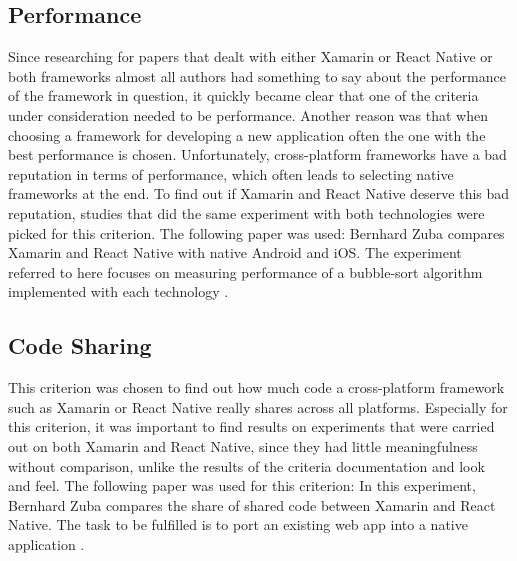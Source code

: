 \documentclass[Bachelor,BIF,english]{twbook}
\begin{document}
\subsection{Performance}
Since researching for papers that dealt with either Xamarin or React Native or both frameworks almost all authors had something to say about the performance of the framework in question, it quickly became clear that one of the criteria under consideration needed to be performance. Another reason was that when choosing a framework for developing a new application often the one with the best performance is chosen. Unfortunately, cross-platform frameworks have a bad reputation in terms of performance, which often leads to selecting native frameworks at the end. To find out if Xamarin and React Native deserve this bad reputation, studies that did the same experiment with both technologies were picked for this criterion. The following paper was used: Bernhard Zuba compares Xamarin and React Native with native Android and iOS. The experiment referred to here focuses on measuring performance of a bubble-sort algorithm implemented with each technology \cite[p.~30-32]{ZubaBernhard2017EdPb}.

\subsection{Code Sharing}
This criterion was chosen to find out how much code a cross-platform framework such as Xamarin or React Native really shares across all platforms. Especially for this criterion, it was important to find results on experiments that were carried out on both Xamarin and React Native, since they had little meaningfulness without comparison, unlike the results of the criteria documentation and look and feel. The following paper was used for this criterion: In this experiment, Bernhard Zuba compares the share of shared code between Xamarin and React Native. The task to be fulfilled is to port an existing web app into a native application \cite[p.~71-73]{ZubaBernhard2017EdPb}.
\end{document}

